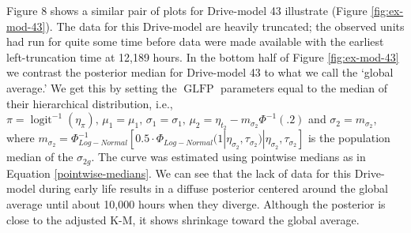 \documentclass[aap]{imsart}
\newcommand{\op}{\operatorname}
\begin{document}
Figure 8 shows a similar pair of plots for Drive-model 43 illustrate (Figure \ref{fig:ex-mod-43}). The data for this Drive-model are heavily truncated; the observed units had run for quite some time before data were made available with the earliest left-truncation time at 12,189 hours. In the bottom half of Figure \ref{fig:ex-mod-43} we contrast the posterior median for Drive-model 43 to what we call the `global average.' We get this by setting the $\op{GLFP}$ parameters equal to the median of their hierarchical distribution, i.e., $\pi=\op{logit}^{-1}(\eta_{\pi}),\, \mu_1=\mu_1,\, \sigma_1=\sigma_1,\, \mu_2=\eta_{t_2} - m_{\sigma_2}\Phi^{-1}(.2)$ and $\sigma_2= m_{\sigma_2}$, where $m_{\sigma_2}=\Phi_{Log-Normal}^{-1}[0.5 \cdot \Phi_{Log-Normal}(1|\eta_{\sigma_2},\tau_{\sigma_2})|\eta_{\sigma_2}, \tau_{\sigma_2}]$ is the population median of the $\sigma_{2g}$. The curve was estimated using pointwise medians as in Equation \ref{pointwise-medians}. We can see that the lack of data for this Drive-model during early life results in a diffuse posterior centered around the global average until about 10,000 hours when they diverge. Although the posterior is close to the adjusted K-M, it shows shrinkage toward the global average.
\end{document}
